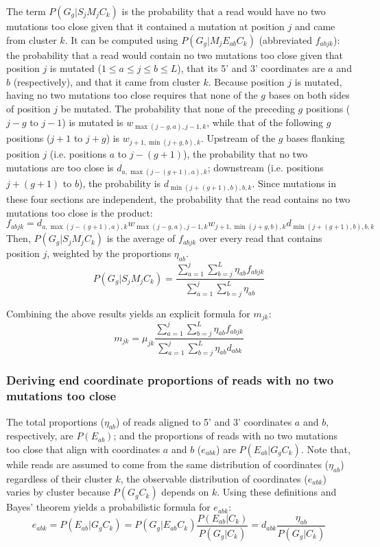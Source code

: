 \documentclass[../../MainTexts/main.tex]{subfiles}
\begin{document}
The term $P(G_g | S_j M_j C_k)$ is the probability that a read would have no two mutations too close given that it contained a mutation at position $j$ and came from cluster $k$.
It can be computed using $P(G_g | M_j E_{ab} C_k)$ (abbreviated $f_{abjk}$): the probability that a read would contain no two mutations too close given that position $j$ is mutated ($1 \le a \le j \le b \le L$), that its 5' and 3' coordinates are $a$ and $b$ (respectively), and that it came from cluster $k$.
Because position $j$ is mutated, having no two mutations too close requires that none of the $g$ bases on both sides of position $j$ be mutated.
The probability that none of the preceding $g$ positions ($j - g$ to $j - 1$) is mutated is $w_{\max(j-g,a),j-1,k}$, while that of the following $g$ positions ($j + 1$ to $j + g$) is $w_{j+1,\min(j+g,b),k}$.
Upstream of the $g$ bases flanking position $j$ (i.e. positions $a$ to $j - (g + 1)$), the probability that no two mutations are too close is $d_{a,\max(j-(g+1),a),k}$; downstream (i.e. positions $j + (g + 1)$ to $b$), the probability is $d_{\min(j+(g+1),b),b,k}$.
Since mutations in these four sections are independent, the probability that the read contains no two mutations too close is the product:
$$f_{abjk} = d_{a,\max(j-(g+1),a),k} w_{\max(j-g,a),j-1,k} w_{j+1,\min(j+g,b),k} d_{\min(j+(g+1),b),b,k}$$
Then, $P(G_g | S_j M_j C_k)$ is the average of $f_{abjk}$ over every read that contains position $j$, weighted by the proportions $\eta_{ab}$.
$$P(G_g | S_j M_j C_k) = \frac{\sum_{a=1}^{j}\sum_{b=j}^{L}\eta_{ab} f_{abjk}}{\sum_{a=1}^{j}\sum_{b=j}^{L}\eta_{ab}}$$

Combining the above results yields an explicit formula for $m_{jk}$:
$$m_{jk} = \mu_{jk} \frac{\sum_{a=1}^{j}\sum_{b=j}^{L}\eta_{ab} f_{abjk}}{\sum_{a=1}^{j}\sum_{b=j}^{L}\eta_{ab}d_{abk}}$$

\subsubsection{Deriving end coordinate proportions of reads with no two mutations too close}
\label{calc_p_ends_noclose}

The total proportions ($\eta_{ab}$) of reads aligned to 5' and 3' coordinates $a$ and $b$, respectively, are $P(E_{ab})$; and the proportions of reads with no two mutations too close that align with coordinates $a$ and $b$ ($e_{abk}$) are $P(E_{ab} | G_g C_k)$.
Note that, while reads are assumed to come from the same distribution of coordinates ($\eta_{ab}$) regardless of their cluster $k$, the observable distribution of coordinates ($e_{abk}$) varies by cluster because $P(G_g C_k)$ depends on $k$.
Using these definitions and Bayes' theorem yields a probabilistic formula for $e_{abk}$:
$$e_{abk} = P(E_{ab} | G_g C_k) = P(G_g | E_{ab} C_k) \frac{P(E_{ab} | C_k)}{P(G_g | C_k)} = d_{abk} \frac{\eta_{ab}}{P(G_g | C_k)}$$
\end{document}
